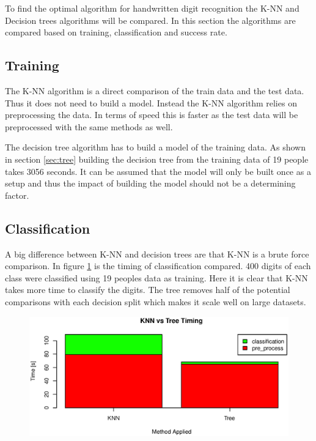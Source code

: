 To find the optimal algorithm for handwritten digit recognition the K-NN and Decision trees algorithms will be compared.
In this section the algorithms are compared based on training, classification and success rate.

\subsection{Training}
The K-NN algorithm is a direct comparison of the train data and the test data.
Thus it does not need to build a model.
Instead the K-NN algorithm relies on preprocessing the data.
In terms of speed this is faster as the test data will be preprocessed with the same methods as well.

The decision tree algorithm has to build a model of the training data. 
As shown in section \ref{sec:tree} building the decision tree from the training data of 19 people takes 3056 seconds.
It can be assumed that the model will only be built once as a setup and thus the impact of building the model should not be a determining factor.

\subsection{Classification}
A big difference between K-NN and decision trees are that K-NN is a brute force comparison.
In figure \ref{fig:algo_compare_timing} is the timing of classification compared.
400 digits of each class were classified using 19 peoples data as training.
Here it is clear that K-NN takes more time to classify the digits.
The tree removes half of the potential comparisons with each decision split which makes it scale well on large datasets.

\begin{figure}[H]
\centering
\includegraphics[width=\textwidth]{graphics/algo_compare_timing}
\label{fig:algo_compare_timing}
\end{figure}

